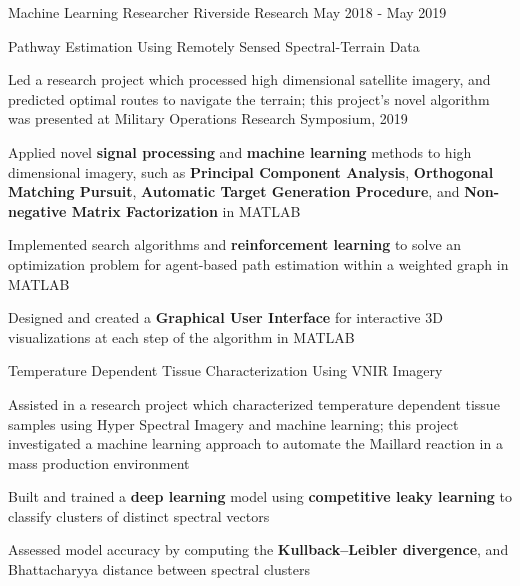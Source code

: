 \begin{cventries}

  \blankcventry
  {Machine Learning Researcher} %
  {Riverside Research} %
  {May 2018 - May 2019} %
  {} %

  \projectentry
  {Pathway Estimation Using Remotely Sensed Spectral-Terrain Data} %
  {\href{https://github.com/jaffourt/Project-Portfolio/tree/main/Project3}{}} %
  {
    \begin{cvitems} %
      \item {Led a research project which processed high dimensional satellite imagery, and predicted optimal routes
      to navigate the terrain; this project's novel algorithm was presented at Military Operations Research Symposium, 2019}
      \item {Applied novel \textbf{signal processing} and \textbf{machine learning} methods to high dimensional imagery,
        such as \textbf{Principal Component Analysis}, \textbf{Orthogonal Matching Pursuit}, \textbf{Automatic Target
        Generation Procedure}, and \textbf{Non-negative Matrix Factorization} in MATLAB}
      \item {Implemented search algorithms and \textbf{reinforcement learning} to solve an optimization problem for agent-based
      path estimation within a weighted graph in MATLAB}
      \item {Designed and created a \textbf{Graphical User Interface} for interactive 3D visualizations at each step of
      the algorithm in MATLAB}
    \end{cvitems}
  }

  \projectentry
  {Temperature Dependent Tissue Characterization Using VNIR Imagery} %
  {\href{https://github.com/jaffourt/Project-Portfolio/blob/main/Project5/Project5.pdf}{}} %
  {
    \begin{cvitems} %
      \item {Assisted in a research project which characterized temperature dependent tissue samples using Hyper
      Spectral Imagery and machine learning; this project investigated a machine learning approach to automate
      the Maillard reaction in a mass production environment}
      \item {Built and trained a \textbf{deep learning} model using \textbf{competitive leaky learning} to classify
      clusters of distinct spectral vectors}
      \item {Assessed model accuracy by computing the \textbf{Kullback–Leibler divergence}, and Bhattacharyya
      distance between spectral clusters}
    \end{cvitems}
  }

\end{cventries}
